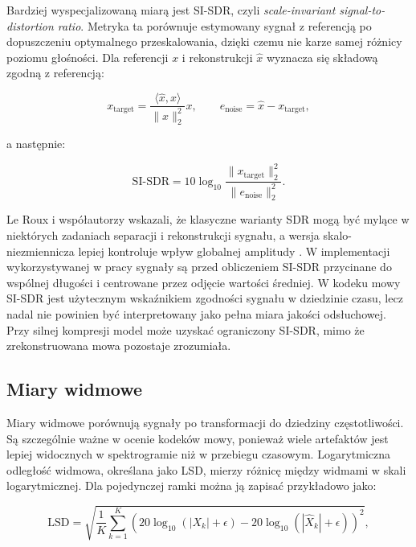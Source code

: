Bardziej wyspecjalizowaną miarą jest SI-SDR, czyli \emph{scale-invariant signal-to-distortion ratio}. Metryka ta porównuje estymowany sygnał z referencją po dopuszczeniu optymalnego przeskalowania, dzięki czemu nie karze samej różnicy poziomu głośności. Dla referencji \(x\) i rekonstrukcji \(\hat{x}\) wyznacza się składową zgodną z referencją:

\begin{equation}
    x_{\mathrm{target}} = \frac{\langle \hat{x}, x\rangle}{\|x\|_2^2}x,
    \qquad
    e_{\mathrm{noise}} = \hat{x} - x_{\mathrm{target}},
\end{equation}

a następnie:

\begin{equation}
    \mathrm{SI\mbox{-}SDR} = 10\log_{10}\frac{\|x_{\mathrm{target}}\|_2^2}{\|e_{\mathrm{noise}}\|_2^2}.
\end{equation}

Le Roux i współautorzy wskazali, że klasyczne warianty SDR mogą być mylące w niektórych zadaniach separacji i rekonstrukcji sygnału, a wersja skalo-niezmiennicza lepiej kontroluje wpływ globalnej amplitudy \cite{LeRoux2019SDR}. W implementacji wykorzystywanej w pracy sygnały są przed obliczeniem SI-SDR przycinane do wspólnej długości i centrowane przez odjęcie wartości średniej. W kodeku mowy SI-SDR jest użytecznym wskaźnikiem zgodności sygnału w dziedzinie czasu, lecz nadal nie powinien być interpretowany jako pełna miara jakości odsłuchowej. Przy silnej kompresji model może uzyskać ograniczony SI-SDR, mimo że zrekonstruowana mowa pozostaje zrozumiała.

\subsection{Miary widmowe}
\label{subsec:metryki-widmowe}

Miary widmowe porównują sygnały po transformacji do dziedziny częstotliwości. Są szczególnie ważne w ocenie kodeków mowy, ponieważ wiele artefaktów jest lepiej widocznych w spektrogramie niż w przebiegu czasowym. Logarytmiczna odległość widmowa, określana jako LSD, mierzy różnicę między widmami w skali logarytmicznej. Dla pojedynczej ramki można ją zapisać przykładowo jako:

\begin{equation}
    \mathrm{LSD} =
    \sqrt{\frac{1}{K}\sum_{k=1}^{K}
    \left(20\log_{10}(|X_k|+\epsilon) -
    20\log_{10}(|\hat{X}_k|+\epsilon)\right)^2},
\end{equation}

